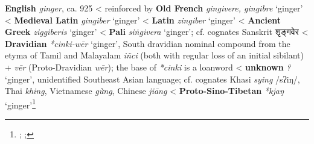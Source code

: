 \begin{etymology}\label{ety:ginger}
\textbf{English} \textit{ginger}, ca. 925
< reinforced by \textbf{Old French} \textit{gingivere, gingibre } `ginger'
< \textbf{Medieval Latin} \textit{gingiber} `ginger'
< \textbf{Latin} \textit{zingiber} `ginger'
< \textbf{Ancient Greek} {} \textit{ziggiberis} `ginger'
< \textbf{Pali} \textit{siṅgivera } `ginger'; cf. cognates Sanskrit शृङ्गवेर 
< \textbf{Dravidian} \textit{*cinki-wēr} `ginger', South dravidian nominal compound  from the etyma of Tamil and Malayalam \textit{iñci} (both with regular loss of an initial sibilant) + \textit{vēr} (Proto-Dravidian \textit{wēr}); the base of \textit{*cinki} is a loanword
< \textbf{unknown} \textit{?} `ginger', unidentified Southeast Asian language; cf. cognates Khasi \textit{sying} /sʔiŋ/, Thai \textit{khing}, Vietnamese \textit{gừng}, Chinese \textit{jiāng}
< \textbf{Proto-Sino-Tibetan} \textit{*kjaŋ} `ginger'\footnote{\textcite{oed, ross_ginger_1952}; \textcite[5]{krishnamurti_dravidian_2003}; }
\end{etymology}